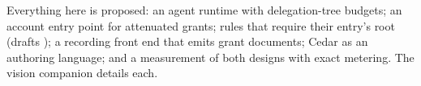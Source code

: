 Everything here is proposed: an agent runtime with delegation-tree budgets; an
account entry point for attenuated grants; rules that require their entry's root
(drafts ); a recording front end that emits grant
documents; Cedar as an authoring language; and a measurement of both designs
with exact metering. The vision companion details each.
